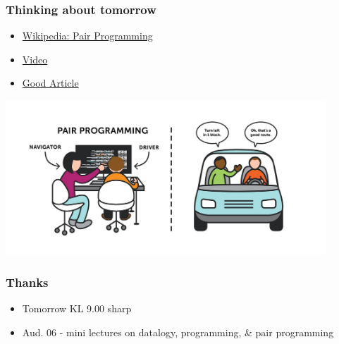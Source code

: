 \documentclass[10pt]{beamer}
\begin{document}
 \begin{frame}
   \frametitle{Thinking about tomorrow}
   \begin{itemize}
   \item \href{https://en.wikipedia.org/wiki/Pair_programming}{Wikipedia: Pair Programming}
   \item \href{https://youtu.be/ET3Q6zNK3Io}{Video}
   \item \href{https://medium.com/@volkanbier_42259/how-to-put-pair-programming-into-action-ce9ebb9d711}{Good Article}
   \end{itemize}
    \includegraphics[width=0.9\textwidth]{images/pairpro}
\end{frame}



 \begin{frame}
   \frametitle{Thanks}
   \begin{itemize}
  \item Tomorrow KL 9.00 sharp
  \item Aud. 06  - mini lectures on datalogy, programming, \& pair programming
   \end{itemize}
   \end{frame}
\end{document}
